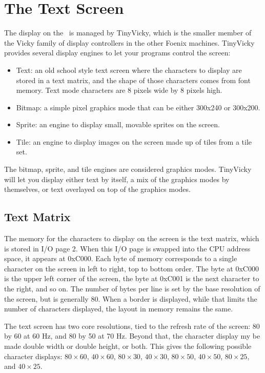 \chapter{The Text Screen}

The display on the \jr\ is managed by TinyVicky, which is the smaller member of the Vicky family of display controllers in the other Foenix machines. TinyVicky provides several display engines to let your programs control the screen:

\begin{itemize}
    \item Text: an old school style text screen where the characters to display are stored in a text matrix, and the shape of those characters comes from font memory. Text mode characters are 8 pixels wide by 8 pixels high.
    \item Bitmap: a simple pixel graphics mode that can be either 300x240 or 300x200.
    \item Sprite: an engine to display small, movable sprites on the screen.
    \item Tile: an engine to display images on the screen made up of tiles from a tile set.
\end{itemize}

The bitmap, sprite, and tile engines are considered graphics modes. TinyVicky will let you display either text by itself, a mix of the graphics modes by themselves, or text overlayed on top of the graphics modes.

\section{Text Matrix}

The memory for the characters to display on the screen is the text matrix, which is stored in I/O page 2. When this I/O page is swapped into the CPU address space, it appears at 0xC000. Each byte of memory corresponds to a single character on the screen in left to right, top to bottom order. The byte at 0xC000 is the upper left corner of the screen, the byte at 0xC001 is the next character to the right, and so on. The number of bytes per line is set by the base resolution of the screen, but is generally 80. When a border is displayed, while that limits the number of characters displayed, the layout in memory remains the same.

The text screen has two core resolutions, tied to the refresh rate of the screen: 80 by 60 at 60 Hz, and 80 by 50 at 70 Hz. Beyond that, the character display my be made double width or double height, or both. This gives the following possible character displays: $80 \times 60$, $40 \times 60$, $80 \times 30$, $40 \times 30$, $80 \times 50$, $40 \times 50$, $80 \times 25$, and $40 \times 25$.

